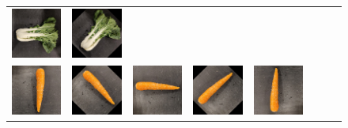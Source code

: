 \begin{figure}[tp]
\begin{center}
\begin{tabular}{c|ccccccc}
			\includegraphics[scale=0.4]{./img/bokchoi_6.png} &
			\includegraphics[scale=0.4]{./img/bokchoi_7.png} \\
			\includegraphics[scale=0.4]{./img/carrot_0.png} &
			\includegraphics[scale=0.4]{./img/carrot_1.png} &
			\includegraphics[scale=0.4]{./img/carrot_2.png} &
			\includegraphics[scale=0.4]{./img/carrot_3.png} &
			\includegraphics[scale=0.4]{./img/carrot_4.png} &

\end{tabular}
\end{center}
\end{figure}
